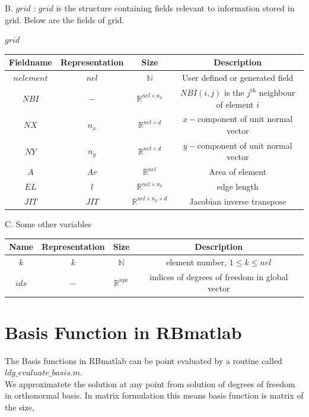 \documentclass[a4paper,12pt]{book}
\begin{document}
B. $grid$ : $grid$ is the structure containing fields relevant to information stored in grid. Below are the fields of grid.
\begin{center}
$grid$\\
\begin{tabular}{|c|c|c|c|}
\hline
\textbf{Fieldname} & \textbf{Representation} & \textbf{Size} & \textbf{Description}\\
\hline
$nelement$ & $nel$ & $\mathbb{N}$ & User defined or generated field\\
\hline
$NBI$ & $-$ & $\mathbb{R}^{nel \times n_0}$ & $NBI(i,j)$ is the $j^{\textrm{th}}$ neighbour of element $i$\\
\hline
$NX$ & $n_x$ & $\mathbb{R}^{nel \times d}$ & $x-$component of unit normal vector\\
\hline
$NY$ & $n_y$ & $\mathbb{R}^{nel \times d}$ & $y-$component of unit normal vector\\
\hline
$A$ & $Ar$ & $\mathbb{R}^{nel}$ & Area of element\\
\hline
$EL$ & $l$ & $\mathbb{R}^{nel \times n_0}$ & edge length\\
\hline
$JIT$ & $JIT$ & $\mathbb{R}^{nel \times n_0 \times d}$ & Jacobian inverse transpose\\
\hline
\end{tabular}
\end{center}

C. Some other variables
\begin{center}
\begin{tabular}{|c|c|c|c|}
\hline
\textbf{Name} & \textbf{Representation} & \textbf{Size} & \textbf{Description}\\
\hline
$k$ & $k$ & $\mathbb{N}$ & element number, $1 \leq k \leq nel$\\
\hline
$ids$ & $-$ & $\mathbb{R}^{npe}$ & indices of degrees of freedom in global vector\\
\hline
\end{tabular}
\end{center}

\section{Basis Function in RBmatlab}

The Basis functions in RBmatlab can be point evaluated by a routine called $ldg\_evaluate\_basis.m$.\\

We approximatete the solution at any point from solution of degrees of freedom in orthonormal basis. In matrix formulation this means basis function is matrix of the size,
\end{document}
